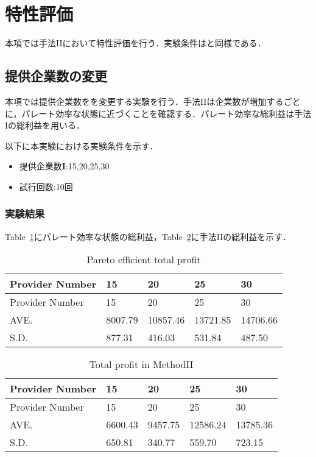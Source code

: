 \hypertarget{ux7279ux6027ux8a55ux4fa1-1}{%
\section{特性評価}\label{ux7279ux6027ux8a55ux4fa1-1}}

本項では手法IIにおいて特性評価を行う．実験条件はと同様である．

\hypertarget{ux63d0ux4f9bux4f01ux696dux6570ux306eux5909ux66f4}{%
\subsection{提供企業数の変更}\label{ux63d0ux4f9bux4f01ux696dux6570ux306eux5909ux66f4}}

本項では提供企業数をを変更する実験を行う．手法IIは企業数が増加するごとに，パレート効率な状態に近づくことを確認する．パレート効率な総利益は手法Iの総利益を用いる．

以下に本実験における実験条件を示す．

\begin{itemize}
\tightlist
\item
  提供企業数\(\boldsymbol{I}\):15,20,25,30
\item
  試行回数:10回
\end{itemize}

\hypertarget{ux5b9fux9a13ux7d50ux679c-3}{%
\subsubsection{実験結果}\label{ux5b9fux9a13ux7d50ux679c-3}}

Table~\ref{tbl:m2-1-pareto-total-profit}にパレート効率な状態の総利益，Table~\ref{tbl:m2-1-total-profit}に手法IIの総利益を示す．

\hypertarget{tbl:m2-1-pareto-total-profit}{}
\begin{longtable}[H]{@{}lllll@{}}
\caption{\label{tbl:m2-1-pareto-total-profit}Pareto efficient total
profit}\tabularnewline
\toprule
Provider Number & 15 & 20 & 25 & 30\tabularnewline
\midrule
\endfirsthead
\toprule
Provider Number & 15 & 20 & 25 & 30\tabularnewline
\midrule
\endhead
AVE. & 8007.79 & 10857.46 & 13721.85 & 14706.66\tabularnewline
S.D. & 877.31 & 416.03 & 531.84 & 487.50\tabularnewline
\bottomrule
\end{longtable}

\hypertarget{tbl:m2-1-total-profit}{}
\begin{longtable}[H]{@{}lllll@{}}
\caption{\label{tbl:m2-1-total-profit}Total profit in
MethodII}\tabularnewline
\toprule
Provider Number & 15 & 20 & 25 & 30\tabularnewline
\midrule
\endfirsthead
\toprule
Provider Number & 15 & 20 & 25 & 30\tabularnewline
\midrule
\endhead
AVE. & 6600.43 & 9457.75 & 12586.24 & 13785.36\tabularnewline
S.D. & 650.81 & 340.77 & 559.70 & 723.15\tabularnewline
\bottomrule
\end{longtable}

